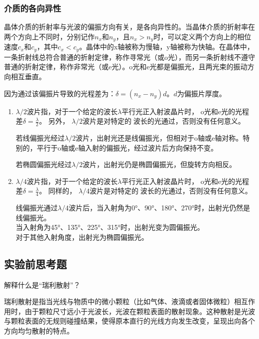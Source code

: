 \documentclass[dvipsnames, svgnames,a4paper,11pt]{article}
\begin{document}
\subsubsection{介质的各向异性}

晶体介质的折射率与光波的偏振方向有关，是各向异性的。当晶体介质的折射率在两个方向上不同时，分别记作$n_x$和$n_y$，且$n_x>n_y$时，可以定义两个方向上的相位速度$c_x$和$c_y$，其中$c_x<c_y$。晶体中的x轴被称为慢轴，y轴被称为快轴。在晶体中，一条折射线总符合普通的折射定律，称作寻常光（或o光），而另一条折射线不遵守普通的折射定律，称作非常光（或e光）。o光和e光都是偏振光，且两光束的振动方向相互垂直。

因为通过该偏振片导致的光程差为：$\delta=(n_x-n_y)d$。$d$为偏振片厚度。

\begin{enumerate}
	\item $\lambda/ 2$波片指，对于一个给定的波长$\lambda$平行光正入射波晶片时， o光和e光的光程差$\delta=\frac{\lambda}{2}$。
	另外， $\lambda/ 2$波片是对特定的波长的光通过，否则没有任何意义。
	
	若线偏振光经过$\lambda/ 2$波片，出射光还是线偏振光，但相对于o轴或e轴对称。特别的，平行于o轴或e轴入射的偏振光，经过波片后方向保持不变。
	
	若椭圆偏振光经过$\lambda/ 2$波片，出射光仍是椭圆偏振光，但旋转方向相反。

	\item $\lambda/ 4$波片指，对于一个给定的波长$\lambda$平行光正入射波晶片时， o光和e光的光程差$\delta=\frac{\lambda}{4}$。
	同样的， $\lambda/ 4$波片是对特定的波长的光通过，否则没有任何意义。

	线偏振光通过$\lambda/ 4$波片后，当入射角为0°、90°、180°、270°时，出射光仍然是线偏振光。\\
	当入射角为45°、135°、225°、315°时，出射光变为圆偏振光。\\
	对于其他入射角度，出射光为椭圆偏振光。


\end{enumerate}



\subsection{实验前思考题}

\begin{question}
	解释什么是“瑞利散射”？
\end{question}


瑞利散射是指当光线与物质中的微小颗粒（比如气体、液滴或者固体微粒）相互作用时，由于颗粒尺寸远小于光波长，光波在颗粒表面的散射现象。这种散射是光波与颗粒表面的无规则碰撞结果，使得原本直行的光线方向发生改变，呈现出向各个方向均匀散射的特点。
\end{document}
